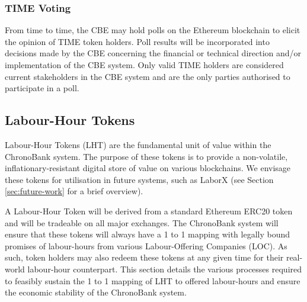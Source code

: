 \begin{multicols}{2}
\subsubsection{TIME Voting}
\label{sec:TIME-voting}
From time to time, the CBE may hold polls on the Ethereum blockchain to elicit the opinion of TIME token holders.  Poll results will be incorporated into decisions made by the CBE concerning the financial or technical direction and/or implementation of the CBE system. Only valid TIME holders are considered current stakeholders in the CBE system and are the only parties authorised to participate in a poll.

\subsection{Labour-Hour Tokens}

Labour-Hour Tokens (LHT) are the fundamental unit of value within the ChronoBank system. The purpose of these tokens is to provide a non-volatile, inflationary-resistant digital store of value on various blockchains. We envisage these tokens for utilisation in future systems, such as LaborX (see Section \ref{sec:future-work} for a brief overview). 

A Labour-Hour Token will be derived from a standard Ethereum ERC20 token and will be tradeable on all major exchanges. The ChronoBank system will ensure that these tokens will always have a 1 to 1 mapping with legally bound promises of labour-hours from various Labour-Offering Companies (LOC). As such, token holders may also redeem these tokens at any given time for their real-world labour-hour counterpart. This section details the various processes required to feasibly sustain the 1 to 1 mapping of LHT to offered labour-hours and ensure the economic stability of the ChronoBank system.  


\end{multicols}
